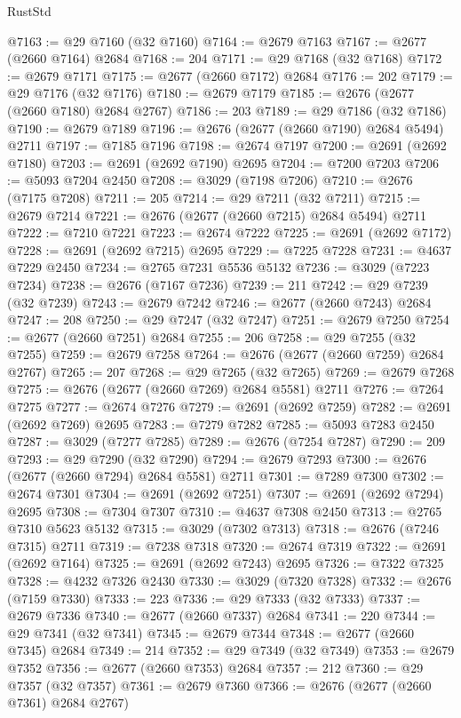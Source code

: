 \begin{lexlean}{RustStd}
\begin{coremodule}
@7163 := @29 @7160 (@32 @7160)
@7164 := @2679 @7163
@7167 := @2677 (@2660 @7164) @2684
@7168 := 204
@7171 := @29 @7168 (@32 @7168)
@7172 := @2679 @7171
@7175 := @2677 (@2660 @7172) @2684
@7176 := 202
@7179 := @29 @7176 (@32 @7176)
@7180 := @2679 @7179
@7185 := @2676 (@2677 (@2660 @7180) @2684 @2767)
@7186 := 203
@7189 := @29 @7186 (@32 @7186)
@7190 := @2679 @7189
@7196 := @2676 (@2677 (@2660 @7190) @2684 @5494) @2711
@7197 := @7185 @7196
@7198 := @2674 @7197
@7200 := @2691 (@2692 @7180)
@7203 := @2691 (@2692 @7190) @2695
@7204 := @7200 @7203
@7206 := @5093 @7204 @2450
@7208 := @3029 (@7198 @7206)
@7210 := @2676 (@7175 @7208)
@7211 := 205
@7214 := @29 @7211 (@32 @7211)
@7215 := @2679 @7214
@7221 := @2676 (@2677 (@2660 @7215) @2684 @5494) @2711
@7222 := @7210 @7221
@7223 := @2674 @7222
@7225 := @2691 (@2692 @7172)
@7228 := @2691 (@2692 @7215) @2695
@7229 := @7225 @7228
@7231 := @4637 @7229 @2450
@7234 := @2765 @7231 @5536 @5132
@7236 := @3029 (@7223 @7234)
@7238 := @2676 (@7167 @7236)
@7239 := 211
@7242 := @29 @7239 (@32 @7239)
@7243 := @2679 @7242
@7246 := @2677 (@2660 @7243) @2684
@7247 := 208
@7250 := @29 @7247 (@32 @7247)
@7251 := @2679 @7250
@7254 := @2677 (@2660 @7251) @2684
@7255 := 206
@7258 := @29 @7255 (@32 @7255)
@7259 := @2679 @7258
@7264 := @2676 (@2677 (@2660 @7259) @2684 @2767)
@7265 := 207
@7268 := @29 @7265 (@32 @7265)
@7269 := @2679 @7268
@7275 := @2676 (@2677 (@2660 @7269) @2684 @5581) @2711
@7276 := @7264 @7275
@7277 := @2674 @7276
@7279 := @2691 (@2692 @7259)
@7282 := @2691 (@2692 @7269) @2695
@7283 := @7279 @7282
@7285 := @5093 @7283 @2450
@7287 := @3029 (@7277 @7285)
@7289 := @2676 (@7254 @7287)
@7290 := 209
@7293 := @29 @7290 (@32 @7290)
@7294 := @2679 @7293
@7300 := @2676 (@2677 (@2660 @7294) @2684 @5581) @2711
@7301 := @7289 @7300
@7302 := @2674 @7301
@7304 := @2691 (@2692 @7251)
@7307 := @2691 (@2692 @7294) @2695
@7308 := @7304 @7307
@7310 := @4637 @7308 @2450
@7313 := @2765 @7310 @5623 @5132
@7315 := @3029 (@7302 @7313)
@7318 := @2676 (@7246 @7315) @2711
@7319 := @7238 @7318
@7320 := @2674 @7319
@7322 := @2691 (@2692 @7164)
@7325 := @2691 (@2692 @7243) @2695
@7326 := @7322 @7325
@7328 := @4232 @7326 @2430
@7330 := @3029 (@7320 @7328)
@7332 := @2676 (@7159 @7330)
@7333 := 223
@7336 := @29 @7333 (@32 @7333)
@7337 := @2679 @7336
@7340 := @2677 (@2660 @7337) @2684
@7341 := 220
@7344 := @29 @7341 (@32 @7341)
@7345 := @2679 @7344
@7348 := @2677 (@2660 @7345) @2684
@7349 := 214
@7352 := @29 @7349 (@32 @7349)
@7353 := @2679 @7352
@7356 := @2677 (@2660 @7353) @2684
@7357 := 212
@7360 := @29 @7357 (@32 @7357)
@7361 := @2679 @7360
@7366 := @2676 (@2677 (@2660 @7361) @2684 @2767)

\end{coremodule}
\end{lexlean}
